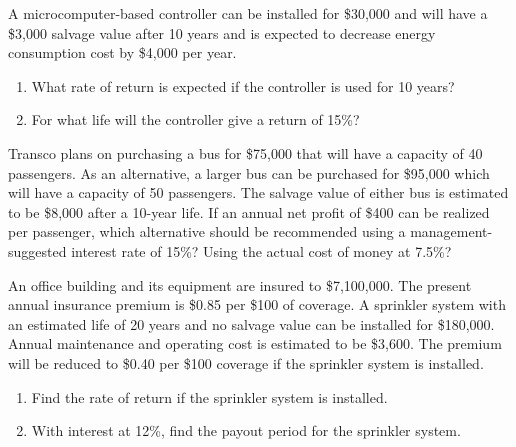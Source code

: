 \begin{exercises}
    \begin{exercise}
    \label{sea-8-12}
        A microcomputer-based controller can be installed for \$30,000 and will have a \$3,000 salvage value after 10 years and is expected to decrease energy consumption cost by \$4,000 per year.
        \begin{enumerate}[label=\alph*)]
            \item What rate of return is expected if the controller is used for 10 years?
            \item For what life will the controller give a return of 15\%?
        \end{enumerate}
    \end{exercise}
    \begin{solution}
    \end{solution}
    
    \begin{exercise}
    \label{sea-8-13}
        Transco plans on purchasing a bus for \$75,000 that will have a capacity of 40 passengers. As an alternative, a larger bus can be purchased for \$95,000 which will have a capacity of 50 passengers. The salvage value of either bus is estimated to be \$8,000 after a 10-year life. If an annual net profit of \$400 can be realized per passenger, which alternative should be recommended using a management-suggested interest rate of 15\%? Using the actual cost of money at 7.5\%?
    \end{exercise}
    \begin{solution}
    \end{solution}
    
    \begin{exercise}
    \label{sea-8-14}
        An office building and its equipment are insured to \$7,100,000. The present annual insurance premium is \$0.85 per \$100 of coverage. A sprinkler system with an estimated life of 20 years and no salvage value can be installed for \$180,000. Annual maintenance and operating cost is estimated to be \$3,600. The premium will be reduced to \$0.40 per \$100 coverage if the sprinkler system is installed.
        \begin{enumerate}[label=\alph*)]
            \item Find the rate of return if the sprinkler system is installed.
            \item With interest at 12\%, find the payout period for the sprinkler system.
        \end{enumerate}
    \end{exercise}
    \begin{solution}
    \end{solution}
    

\end{exercises}
